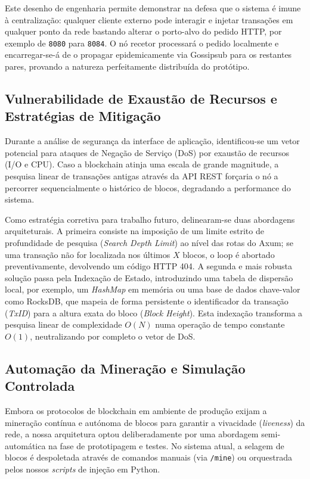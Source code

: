 \documentclass[11pt]{article}
\begin{document}
Este desenho de engenharia permite demonstrar na defesa que o sistema é imune à centralização: qualquer cliente externo pode interagir e injetar transações em qualquer ponto da rede bastando alterar o porto-alvo do pedido HTTP, por exemplo de \texttt{8080} para \texttt{8084}. O nó recetor processará o pedido localmente e encarregar-se-á de o propagar epidemicamente via Gossipsub para os restantes pares, provando a natureza perfeitamente distribuída do protótipo.

\subsection{Vulnerabilidade de Exaustão de Recursos e Estratégias de Mitigação}
Durante a análise de segurança da interface de aplicação, identificou-se um vetor potencial para ataques de Negação de Serviço (DoS) por exaustão de recursos (I/O e CPU). Caso a blockchain atinja uma escala de grande magnitude, a pesquisa linear de transações antigas através da API REST forçaria o nó a percorrer sequencialmente o histórico de blocos, degradando a performance do sistema.

Como estratégia corretiva para trabalho futuro, delinearam-se duas abordagens arquiteturais. A primeira consiste na imposição de um limite estrito de profundidade de pesquisa (\textit{Search Depth Limit}) ao nível das rotas do Axum; se uma transação não for localizada nos últimos $X$ blocos, o loop é abortado preventivamente, devolvendo um código HTTP 404. A segunda e mais robusta solução passa pela Indexação de Estado, introduzindo uma tabela de dispersão local, por exemplo, um \textit{HashMap} em memória ou uma base de dados chave-valor como RocksDB, que mapeia de forma persistente o identificador da transação (\textit{TxID}) para a altura exata do bloco (\textit{Block Height}). Esta indexação transforma a pesquisa linear de complexidade $O(N)$ numa operação de tempo constante $O(1)$, neutralizando por completo o vetor de DoS.

\subsection{Automação da Mineração e Simulação Controlada}
Embora os protocolos de blockchain em ambiente de produção exijam a mineração contínua e autónoma de blocos para garantir a vivacidade (\textit{liveness}) da rede, a nossa arquitetura optou deliberadamente por uma abordagem semi-automática na fase de prototipagem e testes. No sistema atual, a selagem de blocos é despoletada através de comandos manuais (via \texttt{/mine}) ou orquestrada pelos nossos \textit{scripts} de injeção em Python.
\end{document}
